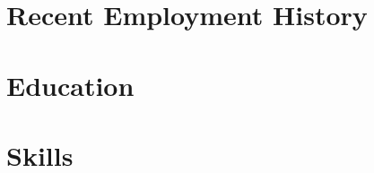 \documentclass[9pt]{resume}
\begin{document}
\maketitle

\section{Recent Employment History}







\section{Education}


\section{Skills}










\end{document}
